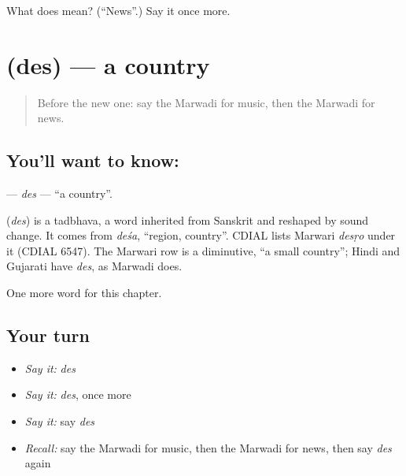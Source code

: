 \begin{tcolorbox}[breakable,colback=teal!4,colframe=teal!35!black,title={Before you move on}]
What does  mean? (\textquotedblleft{}News\textquotedblright{}.) Say it once more.
\end{tcolorbox}
\section[\texorpdfstring{\mw{देस} (des)}{देस (des)}]{ (des) — a country}

\label{lesson:MW-C89-des}



\begin{quote}
Before the new one: say the Marwadi for music, then the Marwadi for news.
\end{quote}

\subsection*{You'll want to know: }
\textbf{} — \emph{des} — \textquotedblleft{}a country\textquotedblright{}.

\begin{cousinweb}
\textbf{} (\emph{des}) is a tadbhava, a word inherited from Sanskrit and reshaped by sound change. It comes from \emph{deśa}, \textquotedblleft{}region, country\textquotedblright{}. CDIAL lists Marwari \emph{desṛo} under it (CDIAL 6547). The Marwari row is a diminutive, \textquotedblleft{}a small country\textquotedblright{}; Hindi and Gujarati have \emph{des}, as Marwadi does.
\end{cousinweb}

\begin{grammarlens}[title={What you've built}]
One more word for this chapter.
\end{grammarlens}

\subsection*{Your turn}
\begin{itemize}
\raggedright
  \item \emph{Say it:} \emph{des}
  \item \emph{Say it:} \emph{des}, once more
  \item \emph{Say it:} say \emph{des}
  \item \emph{Recall:} say the Marwadi for music, then the Marwadi for news, then say \emph{des} again
\end{itemize}

